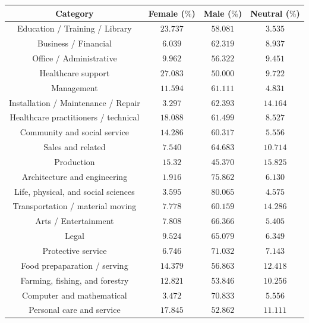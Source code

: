 \documentclass[fleqn,10pt]{article}
\begin{document}
\begin{table}[H]
\small{
	\centering
	\begin{tabular}{|c|c|c|c|}
	\hline
	Category 								& Female ($\%$)	& Male ($\%$)	& Neutral ($\%$) \\ \hline
	\hline		
	Education / Training / Library 			& $23.737$ 		& $58.081$		& $3.535$		\\ \hline
	Business / Financial 					& $6.039$		& $62.319$		& $8.937$		\\ \hline
	Office / Administrative					& $9.962$		& $56.322$		& $9.451$		\\ \hline
	Healthcare support						& $27.083$		& $50.000$		& $9.722$		\\ \hline
	Management								& $11.594$		& $61.111$		& $4.831$		\\ \hline
	Installation / Maintenance / Repair		& $3.297$		& $62.393$		& $14.164$		\\ \hline
	Healthcare practitioners / technical	& $18.088$		& $61.499$		& $8.527$		\\ \hline
	Community and social service			& $14.286$ 		& $60.317$		& $5.556$		\\ \hline
	Sales and related						& $7.540$		& $64.683$		& $10.714$		\\ \hline
	Production								& $15.32$		& $45.370$		& $15.825$		\\ \hline
	Architecture and engineering			& $1.916$		& $75.862$		& $6.130$		\\ \hline
	Life, physical, and social sciences		& $3.595$		& $80.065$		& $4.575$		\\ \hline
	Transportation / material moving		& $7.778$		& $60.159$		& $14.286$		\\ \hline
	Arts / Entertainment					& $7.808$		& $66.366$		& $5.405$		\\ \hline
	Legal									& $9.524$ 		& $65.079$		& $6.349$		\\ \hline
	Protective service						& $6.746$		& $71.032$		& $7.143$		\\ \hline
	Food prepaparation / serving			& $14.379$ 		& $56.863$		& $12.418$		\\ \hline
	Farming, fishing, and forestry			& $12.821$ 		& $53.846$		& $10.256$		\\ \hline
	Computer and mathematical				& $3.472$		& $70.833$		& $5.556$		\\ \hline
	Personal care and service				& $17.845$ 		& $52.862$		& $11.111$		\\ \hline

\end{tabular}}
\end{table}
\end{document}
